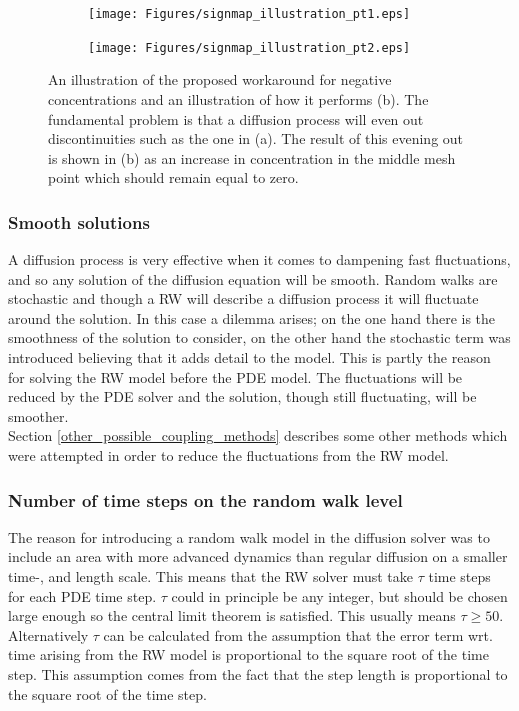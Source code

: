 \begin{figure}[H]
\centering
\begin{subfigure}[t!]{0.48\textwidth}
 \texttt{[image: Figures/signmap\_illustration\_pt1.eps]}
 \caption{}
\end{subfigure}
\begin{subfigure}[t!]{0.48\textwidth}
 \texttt{[image: Figures/signmap\_illustration\_pt2.eps]}
 \caption{}
\end{subfigure}
\caption[Workaround for negative concentrations, illustration]{An illustration of the proposed workaround for negative concentrations and an illustration of how it performs (b). The fundamental problem is that a diffusion process will even out discontinuities such as the one in (a). The result of this evening out is shown in (b) as an increase in concentration in the middle mesh point which should remain equal to zero.}
\label{theory:signmap_illustration}
 \end{figure}

\subsubsection{Smooth solutions}

 A diffusion process is very effective when it comes to dampening fast fluctuations, and so any solution of the diffusion equation will be smooth. 
 Random walks are stochastic and though a RW will describe a diffusion process it will fluctuate around the solution. 
 In this case a dilemma arises; on the one hand there is the smoothness of the solution to consider, on the other hand the stochastic term was introduced believing that it adds detail to the model. 
This is partly the reason for solving the RW model before the PDE model. 
The fluctuations will be reduced by the PDE solver and the solution, though still fluctuating, will be smoother. \\

Section \ref{other_possible_coupling_methods} describes some other methods which were attempted in order to reduce the fluctuations from the RW model.

\subsubsection{Number of time steps on the random walk level}
The reason for introducing a random walk model in the diffusion solver was to include an area with more advanced dynamics than regular diffusion on a smaller time-, and length scale. 
This means that the RW solver must take $\tau$ time steps for each PDE time step. 
$\tau$ could in principle be any integer, but should be chosen large enough so the central limit theorem is satisfied. 
This usually means $\tau\geq50$. \\
Alternatively $\tau$ can be calculated from the assumption that the error term wrt. time arising from the RW model is proportional to the square root of the time step. 
This assumption comes from the fact that the step length is proportional to the square root of the time step.

